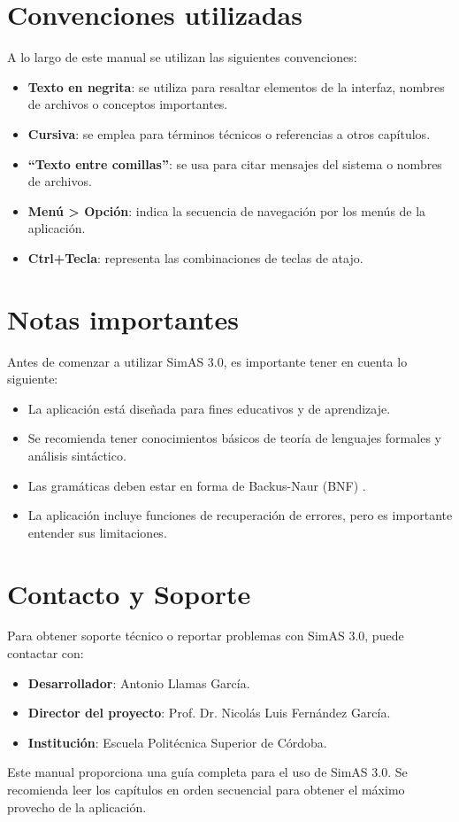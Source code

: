 \section{Convenciones utilizadas}

A lo largo de este manual se utilizan las siguientes convenciones:

\begin{itemize}
    \item \textbf{Texto en negrita}: se utiliza para resaltar elementos de la interfaz, nombres de archivos o conceptos importantes.
    \item \textbf{Cursiva}: se emplea para términos técnicos o referencias a otros capítulos.
    \item \textbf{``Texto entre comillas''}: se usa para citar mensajes del sistema o nombres de archivos.
    \item \textbf{Menú > Opción}: indica la secuencia de navegación por los menús de la aplicación.
    \item \textbf{Ctrl+Tecla}: representa las combinaciones de teclas de atajo.
\end{itemize}

\section{Notas importantes}

Antes de comenzar a utilizar SimAS 3.0, es importante tener en cuenta lo siguiente:

\begin{itemize}
    \item La aplicación está diseñada para fines educativos y de aprendizaje.
    \item Se recomienda tener conocimientos básicos de teoría de lenguajes formales y análisis sintáctico.
    \item Las gramáticas deben estar en forma de Backus-Naur (BNF) \cite{bnf}.
    \item La aplicación incluye funciones de recuperación de errores, pero es importante entender sus limitaciones.
\end{itemize}

\section{Contacto y Soporte}

Para obtener soporte técnico o reportar problemas con SimAS 3.0, puede contactar con:

\begin{itemize}
    \item \textbf{Desarrollador}: Antonio Llamas García.
    \item \textbf{Director del proyecto}: Prof. Dr. Nicolás Luis Fernández García.
    \item \textbf{Institución}: Escuela Politécnica Superior de Córdoba.
\end{itemize}

Este manual proporciona una guía completa para el uso de SimAS 3.0. Se recomienda leer los capítulos en orden secuencial para obtener el máximo provecho de la aplicación.